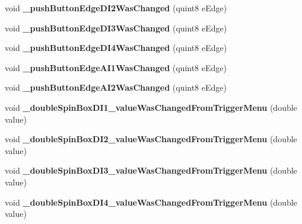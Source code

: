 \begin{DoxyCompactItemize}
\item 
\mbox{\label{class_trigger_window_a1966d1f1e59708c2f31079f7c23ea247}} 
void {\bfseries \+\_\+push\+Button\+Edge\+D\+I2\+Was\+Changed} (quint8 e\+Edge)
\item 
\mbox{\label{class_trigger_window_af548085f8255f01dfebf1455a065a6e9}} 
void {\bfseries \+\_\+push\+Button\+Edge\+D\+I3\+Was\+Changed} (quint8 e\+Edge)
\item 
\mbox{\label{class_trigger_window_a0aaeb9648dc1f4fa7125985da92609cb}} 
void {\bfseries \+\_\+push\+Button\+Edge\+D\+I4\+Was\+Changed} (quint8 e\+Edge)
\item 
\mbox{\label{class_trigger_window_afa7aaa067ceb141d8677c89e729f1437}} 
void {\bfseries \+\_\+push\+Button\+Edge\+A\+I1\+Was\+Changed} (quint8 e\+Edge)
\item 
\mbox{\label{class_trigger_window_a521125f55e4c05f591230fa5565f097d}} 
void {\bfseries \+\_\+push\+Button\+Edge\+A\+I2\+Was\+Changed} (quint8 e\+Edge)
\item 
\mbox{\label{class_trigger_window_a2c1bdb175c1a6f19e1191dffbec99003}} 
void {\bfseries \+\_\+double\+Spin\+Box\+D\+I1\+\_\+value\+Was\+Changed\+From\+Trigger\+Menu} (double value)
\item 
\mbox{\label{class_trigger_window_a856b0bd309451f64b331ca0608413cae}} 
void {\bfseries \+\_\+double\+Spin\+Box\+D\+I2\+\_\+value\+Was\+Changed\+From\+Trigger\+Menu} (double value)
\item 
\mbox{\label{class_trigger_window_aa9a65296923e0752e8d8f968d3e612f9}} 
void {\bfseries \+\_\+double\+Spin\+Box\+D\+I3\+\_\+value\+Was\+Changed\+From\+Trigger\+Menu} (double value)
\item 
\mbox{\label{class_trigger_window_a38f2cbc8b8ecddecc01e083a222e5ac9}} 
void {\bfseries \+\_\+double\+Spin\+Box\+D\+I4\+\_\+value\+Was\+Changed\+From\+Trigger\+Menu} (double value)
\item 
\mbox{\label{class_trigger_window_a42da2b52b6dd19c9e94f9ace8b0b3ad5}} 

\end{DoxyCompactItemize}
